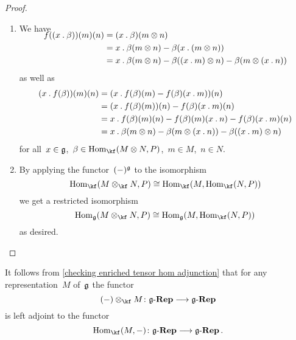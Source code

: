 \begin{proof}
	\leavevmode
	\begin{enumerate}
		\item
			We have
			\begin{align*}
				\SwapAboveDisplaySkip
				f( (x \act \beta) )(m)(n)
				&=
				(x \act \beta)(m \tensor n)
				\\
				&=
				x \act \beta(m \tensor n)
				- \beta( x \act (m \tensor n) )
				\\
				&=
				x \act \beta(m \tensor n)
				- \beta( (x \act m) \tensor n )
				- \beta( m \tensor (x \act n) )
			\end{align*}
			as well as
			\begin{align*}
				( x \mathbin{.} f(\beta) )(m)(n)
				&=
				( x \mathbin{.} f(\beta)(m) - f(\beta)(x \mathbin{.} m) )(n)
				\\
				&=
				( x \mathbin{.} f(\beta)(m) )(n)
				- f(\beta)(x \mathbin{.} m)(n)
				\\
				&=
				x \mathbin{.} f(\beta)(m)(n)
				- f(\beta)(m)(x \mathbin{.} n)
				- f(\beta)(x \mathbin{.} m)(n)
				\\
				&=
				x \mathbin{.} \beta(m \otimes n)
				- \beta( m \otimes (x \mathbin{.} n) )
				- \beta( (x \mathbin{.} m) \otimes n )
			\end{align*}
			for all~$x \in \mathfrak{g}$,~$\beta \in \Hom_{\kf}(M \tensor N, P)$,~$m \in M$,~$n \in N$.
		\item
			By applying the functor~$(-)^{\mathfrak{g}}$ to the isomorphism
			\[
				\Hom_{\kf}( M \tensor_{\kf} N, P )
				\cong
				\Hom_{\kf}( M, \Hom_{\kf}(N, P) )
			\]
			we get a restricted isomorphism
			\[
				\Hom_{\glie}( M \tensor_{\kf} N, P )
				\cong
				\Hom_{\glie}( M, \Hom_{\kf}(N, P) ) \,
			\]
			as desired.
		\qedhere
	\end{enumerate}
\end{proof}


\begin{remark}
	\label{enriched tensor hom adjunction}
	It follows from \cref{checking enriched tensor hom adjunction} that for any representation~$M$ of~$\mathfrak{g}$ the functor
	\[
		(\ph) \tensor_{\kf} M
		\colon
		\cRep{\glie}
		\to
		\cRep{\glie}
	\]
	is left adjoint to the functor
	\[
		\Hom_{\kf}(M, \ph)
		\colon
		\cRep{\glie}
		\to
		\cRep{\glie} \,.
	\]
\end{remark}


